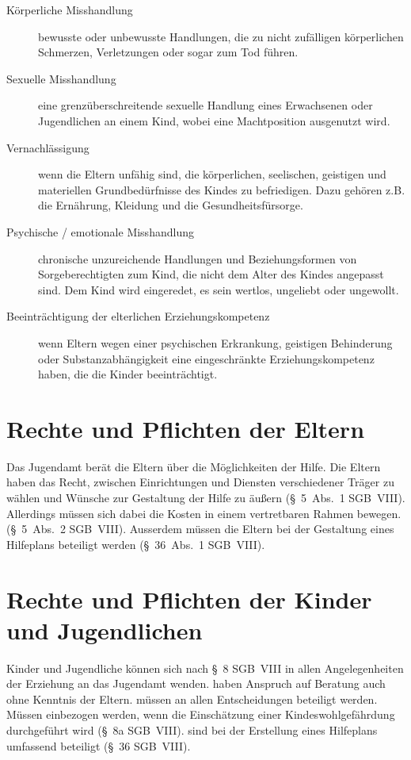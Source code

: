 \documentclass{ejsreport}
\begin{document}
\begin{description}
  \item [Körperliche Misshandlung] 
  bewusste oder unbewusste Handlungen, die zu nicht zu\-fälligen
  körperlichen Schmerzen, Verletzungen oder sogar zum Tod führen.
  \item [Sexuelle Misshandlung]
  eine grenzüberschreitende sexuelle Handlung eines Erwachsenen
  oder Jugendlichen an einem Kind, wobei eine Machtposition
  ausgenutzt wird.
  \item [Vernachlässigung]
  wenn die Eltern unfähig sind, die körperlichen, seelischen, geistigen
  und materiellen Grundbedürfnisse des Kindes zu befriedigen. 
  Dazu gehören z.B. die Ernährung, Kleidung und die Gesundheitsfürsorge.
  \item [Psychische / emotionale Misshandlung]
  chronische unzureichende Handlungen und Beziehungsformen
  von Sorgeberechtigten zum Kind, die nicht dem Alter des Kindes
  angepasst sind. Dem Kind wird eingeredet, es sein wertlos, ungeliebt
  oder ungewollt.
  \item [Beeinträchtigung der elterlichen Erziehungskompetenz]
  wenn Eltern wegen einer psychischen Erkrankung, 
  geistigen Behinderung oder Substanzabhängigkeit eine eingeschränkte
  Erziehungskompetenz haben, die die Kinder beeinträchtigt.
\end{description}

\section{Rechte und Pflichten der Eltern}

Das Jugendamt berät die Eltern über die Möglichkeiten der Hilfe. 
Die Eltern haben das Recht, zwischen Einrichtungen und Diensten verschiedener 
Träger zu wählen und Wünsche zur Gestaltung der Hilfe zu äußern 
(§~5~Abs.~1 SGB~VIII). Allerdings müssen sich dabei die Kosten 
in einem vertretbaren Rahmen bewegen. (§~5~Abs.~2 SGB~VIII).
Ausserdem müssen die Eltern bei der Gestaltung eines Hilfeplans 
beteiligt werden (§~36~Abs.~1 SGB~VIII).

\section{Rechte und Pflichten der Kinder und Jugendlichen}

Kinder und Jugendliche können sich nach §~8 SGB~VIII in allen Angelegenheiten der Erziehung an das Jugendamt wenden.
haben Anspruch auf Beratung auch ohne Kenntnis der Eltern.
müssen an allen Entscheidungen beteiligt werden.
Müssen einbezogen werden, wenn die Einschätzung einer Kindeswohlgefährdung durchgeführt wird 
(§~8a SGB~VIII).
sind bei der Erstellung eines Hilfeplans umfassend beteiligt 
(§~36 SGB~VIII).
\end{document}

